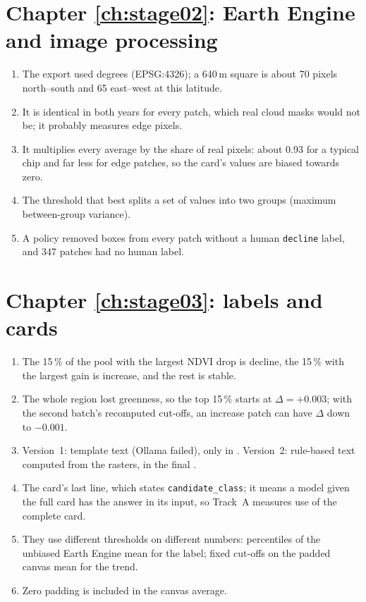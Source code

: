 \section*{Chapter \ref{ch:stage02}: Earth Engine and image processing}
\begin{enumerate}
  \item The export used degrees (EPSG:4326); a 640\,m square is about 70 pixels north--south and 65 east--west at this latitude.
  \item It is identical in both years for every patch, which real cloud masks would not be; it probably measures edge pixels.
  \item It multiplies every average by the share of real pixels: about 0.93 for a typical chip and far less for edge patches, so the card's values are biased towards zero.
  \item The threshold that best splits a set of values into two groups (maximum between-group variance).
  \item A policy removed boxes from every patch without a human \texttt{decline} label, and 347 patches had no human label.
\end{enumerate}

\section*{Chapter \ref{ch:stage03}: labels and cards}
\begin{enumerate}
  \item The 15\,\% of the pool with the largest NDVI drop is decline, the 15\,\% with the largest gain is increase, and the rest is stable.
  \item The whole region lost greenness, so the top 15\,\% starts at $\Delta = +0.003$; with the second batch's recomputed cut-offs, an increase patch can have $\Delta$ down to $-0.001$.
  \item Version~1: template text (Ollama failed), only in . Version~2: rule-based text computed from the rasters, in the final .
  \item The card's last line, which states \texttt{candidate\_class}; it means a model given the full card has the answer in its input, so Track~A measures use of the complete card.
  \item They use different thresholds on different numbers: percentiles of the unbiased Earth Engine mean for the label; fixed cut-offs on the padded canvas mean for the trend.
  \item Zero padding is included in the canvas average.
\end{enumerate}

